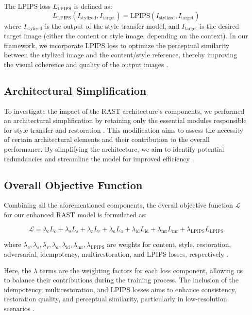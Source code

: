 \documentclass{article}
\begin{document}
The LPIPS loss \( L_{\text{LPIPS}} \) is defined as:
\[
L_{\text{LPIPS}}(I_{\text{stylized}}, I_{\text{target}}) = \text{LPIPS}(I_{\text{stylized}}, I_{\text{target}})
\]
where \( I_{\text{stylized}} \) is the output of the style transfer model, and \( I_{\text{target}} \) is the desired target image (either the content or style image, depending on the context). In our framework, we incorporate LPIPS loss to optimize the perceptual similarity between the stylized image and the content/style reference, thereby improving the visual coherence and quality of the output images \cite{Zhang2018LPIPS, Wang2019}.

\subsection{Architectural Simplification}
To investigate the impact of the RAST architecture's components, we performed an architectural simplification by retaining only the essential modules responsible for style transfer and restoration \cite{Vazquez2018}. This modification aims to assess the necessity of certain architectural elements and their contribution to the overall performance. By simplifying the architecture, we aim to identify potential redundancies and streamline the model for improved efficiency \cite{Fernandez2019}.

\subsection{Overall Objective Function}
Combining all the aforementioned components, the overall objective function \( \mathcal{L} \) for our enhanced RAST model is formulated as:

\[
\mathcal{L} = \lambda_c L_c + \lambda_s L_s + \lambda_r L_r + \lambda_a L_a + \lambda_{\text{id}} L_{\text{id}} + \lambda_{\text{mr}} L_{\text{mr}} + \lambda_{\text{LPIPS}} L_{\text{LPIPS}}
\]

where \( \lambda_c, \lambda_s, \lambda_r, \lambda_a, \lambda_{\text{id}}, \lambda_{\text{mr}}, \lambda_{\text{LPIPS}} \) are weights for content, style, restoration, adversarial, idempotency, multirestoration, and LPIPS losses, respectively \cite{He2016, Zhang2018LPIPS}.

Here, the \( \lambda \) terms are the weighting factors for each loss component, allowing us to balance their contributions during the training process. The inclusion of the idempotency, multirestoration, and LPIPS losses aims to enhance consistency, restoration quality, and perceptual similarity, particularly in low-resolution scenarios \cite{Liu2020, Li2018, Zhang2018LPIPS}.
\end{document}

